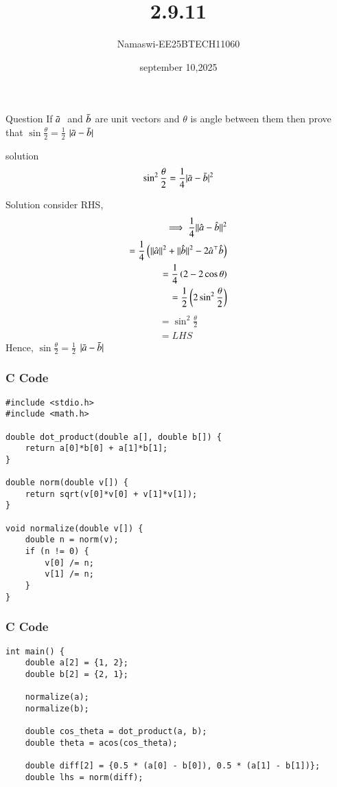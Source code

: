 \documentclass{beamer}
\begin{document}
\title 
{2.9.11}
\date{september 10,2025}
\author 
{Namaswi-EE25BTECH11060}
\frame{\titlepage}
\begin{frame}{Question}
If $\Bar{a} \;$ and \;$ \Bar{b} $ are unit vectors and $\theta$ is angle between them then prove that $\sin\frac{\theta}{2}=\frac{1}{2}$ $| {\Bar{a}-\Bar{b}}|$
\end{frame}
\begin{frame}{solution}
 \begin{align*}
    \sin^2\frac{\theta}{2}=\frac{1}{4}| {\Bar{a}-\Bar{b}}|^2\\
    \end{align*}
    \end{frame}
    \begin{frame}{Solution}
  consider RHS,\\
\begin{align}
 \implies \frac{1}{4}|| {\hat{a}-\hat{b}}||^2\\
  =\frac{1}{4} \left(||\hat{a}||^2+||\hat{b}||^2-2\hat{a}^\top\hat{b}\right)\\
  =\frac{1}{4}\left(2-2\cos \theta\right)\\
  =\frac{1}{2}\left(2\sin^2{\frac{\theta}{2}}\right)\\
  \end{align}
  \begin{align}
=\sin^2\frac{\theta}{2}\\
=LHS
\end{align}
Hence, $\sin\frac{\theta}{2}=\frac{1}{2}$  $| {\Bar{a}-\Bar{b}}|
$ 
\end{frame}
 
\begin{frame}[fragile]
\frametitle{C Code }
\begin{lstlisting}
#include <stdio.h>
#include <math.h>

double dot_product(double a[], double b[]) {
    return a[0]*b[0] + a[1]*b[1];
}

double norm(double v[]) {
    return sqrt(v[0]*v[0] + v[1]*v[1]);
}

void normalize(double v[]) {
    double n = norm(v);
    if (n != 0) {
        v[0] /= n;
        v[1] /= n;
    }
}
\end{lstlisting}
\end{frame}

\begin{frame}[fragile]
    \frametitle{C Code}
    \begin{lstlisting}
int main() {
    double a[2] = {1, 2};
    double b[2] = {2, 1};

    normalize(a);
    normalize(b);

    double cos_theta = dot_product(a, b);
    double theta = acos(cos_theta); 

    double diff[2] = {0.5 * (a[0] - b[0]), 0.5 * (a[1] - b[1])};
    double lhs = norm(diff);
\end{lstlisting}
\end{frame}
\end{document}
